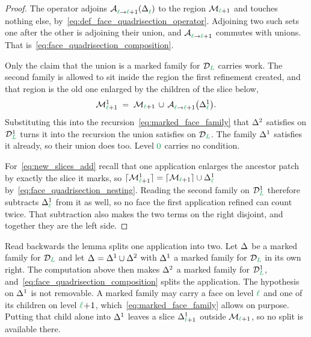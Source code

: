 \documentclass[a4paper, 12pt]{article}
\makeatletter
\newcommand{\green}{\color{ForestGreen}}
\DeclareRobustCommand{\simplexsubsetTwo}[2][]{\Delta\ifx\@empty#1\@empty\else^{#1}\fi_{#2}}
\renewcommand{\l}{{\green\ell}}
\renewcommand{\L}{{\green L}}
\newcommand{\lzero}{{\green 0}}
\newcommand{\Aop}[3]{\mathcal{A}^{#1}_{{#2} \to {#3}}}
\newcommand{\M}{\mathcal{M}}
\theoremstyle{definition}
\theoremstyle{plain}
\numberwithin{equation}{section}
\newcommand{\ancestorPatch}[1]{\lceil #1 \rceil}
\DeclareRobustCommand{\domseq}[1][]{\mathcal{D}\ifx\@empty#1\@empty\else_{#1}\fi}
\makeatother
\begin{document}
\begin{proof}
    The operator adjoins $\Aop{}{\l}{\l+1}(\simplexsubsetTwo{\l})$ to the region $\M_{\l+1}$ and touches nothing else, by~\eqref{eq:def_face_quadrisection_operator}. Adjoining two such sets one after the other is adjoining their union, and $\Aop{}{\l}{\l+1}$ commutes with unions. That is~\eqref{eq:face_quadrisection_composition}.

    Only the claim that the union is a marked family for $\domseq[\L]$ carries work. The second family is allowed to sit inside the region the first refinement created, and that region is the old one enlarged by the children of the slice below,
    \begin{equation*}
        \M^1_{\l+1} \; = \; \M_{\l+1} \, \cup \, \Aop{}{\l}{\l+1} \big( \simplexsubsetTwo[1]{\l} \big) .
    \end{equation*}
    Substituting this into the recursion~\eqref{eq:marked_face_family} that $\simplexsubsetTwo[2]{}$ satisfies on $\domseq[\L]^1$ turns it into the recursion the union satisfies on $\domseq[\L]$. The family $\simplexsubsetTwo[1]{}$ satisfies it already, so their union does too. Level $\lzero$ carries no condition.

    For~\eqref{eq:new_slices_add} recall that one application enlarges the ancestor patch by exactly the slice it marks, so $\ancestorPatch{\M^1_{\l+1}} = \ancestorPatch{\M_{\l+1}} \cup \simplexsubsetTwo[1]{\l}$ by~\eqref{eq:face_quadrisection_nesting}. Reading the second family on $\domseq[\L]^1$ therefore subtracts $\simplexsubsetTwo[1]{\l}$ from it as well, so no face the first application refined can count twice. That subtraction also makes the two terms on the right disjoint, and together they are the left side.
\end{proof}

Read backwards the lemma splits one application into two. Let $\simplexsubsetTwo{}$ be a marked family for $\domseq[\L]$ and let $\simplexsubsetTwo{} = \simplexsubsetTwo[1]{} \cup \simplexsubsetTwo[2]{}$ with $\simplexsubsetTwo[1]{}$ a marked family for $\domseq[\L]$ in its own right. The computation above then makes $\simplexsubsetTwo[2]{}$ a marked family for $\domseq[\L]^1$, and~\eqref{eq:face_quadrisection_composition} splits the application. The hypothesis on $\simplexsubsetTwo[1]{}$ is not removable. A marked family may carry a face on level $\l$ and one of its children on level $\l \! + \! 1$, which~\eqref{eq:marked_face_family} allows on purpose. Putting that child alone into $\simplexsubsetTwo[1]{}$ leaves a slice $\simplexsubsetTwo[1]{\l+1}$ outside $\M_{\l+1}$, so no split is available there.
\end{document}
